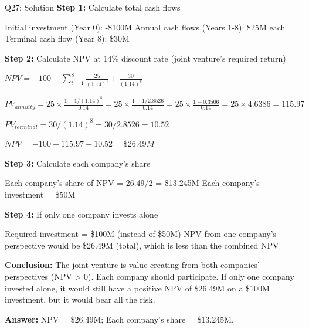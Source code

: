 \documentclass{beamer}
\renewcommand{\scriptsize}{\fontsize{6pt}{7pt}\selectfont}
\begin{document}
	\begin{frame}{Q27: Solution}
		\scriptsize
		\textbf{Step 1:} Calculate total cash flows
		
		Initial investment (Year 0): -\$100M
		Annual cash flows (Years 1-8): \$25M each
		Terminal cash flow (Year 8): \$30M
		
		\vspace{2pt}
		\textbf{Step 2:} Calculate NPV at 14\% discount rate (joint venture's required return)
		
		$NPV = -100 + \sum_{t=1}^{8} \frac{25}{(1.14)^t} + \frac{30}{(1.14)^8}$
		
		$PV_{annuity} = 25 \times \frac{1 - 1/(1.14)^8}{0.14} = 25 \times \frac{1 - 1/2.8526}{0.14} = 25 \times \frac{1 - 0.3506}{0.14} = 25 \times 4.6386 = 115.97$
		
		$PV_{terminal} = 30/(1.14)^8 = 30/2.8526 = 10.52$
		
		$NPV = -100 + 115.97 + 10.52 = \$26.49M$
		
		\vspace{2pt}
		\textbf{Step 3:} Calculate each company's share
		
		Each company's share of NPV = 26.49/2 = \$13.245M
		Each company's investment = \$50M
		
		\vspace{2pt}
		\textbf{Step 4:} If only one company invests alone
		
		Required investment = \$100M (instead of \$50M)
		NPV from one company's perspective would be \$26.49M (total), which is less than the combined NPV
		
		\vspace{2pt}
		\textbf{Conclusion:} The joint venture is value-creating from both companies' perspectives (NPV > 0). Each company should participate. If only one company invested alone, it would still have a positive NPV of \$26.49M on a \$100M investment, but it would bear all the risk.
		
		\textbf{Answer:} NPV = \$26.49M; Each company's share = \$13.245M.
	\end{frame}
	
\end{document}
